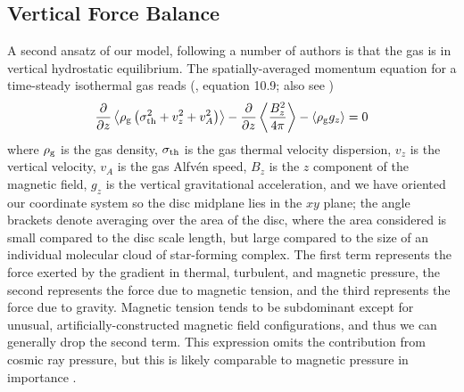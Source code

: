 \documentclass[useAMS,usenatbib]{mn2e}
\begin{document}
\subsection{Vertical Force Balance}

A second ansatz of our model, following a number of authors \citep[e.g.,][]{boulares90a, piontek07a, koyama09a, ostriker10a} is that the gas is in vertical hydrostatic equilibrium. The spatially-averaged momentum equation for a time-steady isothermal gas reads (\citealt{krumholz17b}, equation 10.9; also see \citealt{kim15b})
\begin{equation}
\label{eq:vert_hydrostatic}
\frac{\partial}{\partial z} \left\langle \rho_{\rm g} \left(\sigma_{\rm th}^2 + v_z^2 + v_A^2\right)\right\rangle - \frac{\partial}{\partial z}\left\langle\frac{B_z^2}{4\pi}\right\rangle -\left\langle\rho_{\rm g} g_z\right\rangle = 0
\end{equation}
where $\rho_{\rm g}$ is the gas density, $\sigma_{\rm th}$ is the gas thermal velocity dispersion, $v_z$ is the vertical velocity, $v_A$ is the gas Alfv\'en speed, $B_z$ is the $z$ component of the magnetic field, $g_z$ is the vertical gravitational acceleration, and we have oriented our coordinate system so the disc midplane lies in the $xy$ plane; the angle brackets denote averaging over the area of the disc, where the area considered is small compared to the disc scale length, but large compared to the size of an individual molecular cloud of star-forming complex. The first term represents the force exerted by the gradient in thermal, turbulent, and magnetic pressure, the second represents the force due to magnetic tension, and the third represents the force due to gravity. Magnetic tension tends to be subdominant except for unusual, artificially-constructed magnetic field configurations, and thus we can generally drop the second term. This expression omits the contribution from cosmic ray pressure, but this is likely comparable to magnetic pressure in importance \citep[e.g.,][]{boulares90a}.
\end{document}
